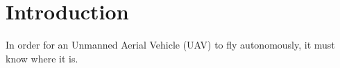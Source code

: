 \section{Introduction}
\label{sec:intro}
In order for an Unmanned Aerial Vehicle (UAV) to fly autonomously, it must know where it is. 